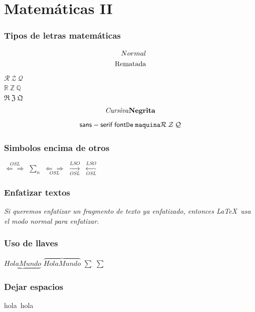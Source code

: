 \documentclass[a4paper,11pt]{article}
\begin{document}
 \listoffigures%
\part{Matemáticas II}
\section{Tipos de letras matemáticas}
\begin{align}
\mathnormal{Normal}\\
\mathrm{Rematada}
\end{align}
$\mathcal{R\:Z\:Q}$ \\%
$\mathbb{R\:Z\:Q}$ \\%
$\mathfrak{R\:Z\:Q}$ \\ %
\begin{displaymath}
  \mathit{Cursiva}\\
  \mathbf{Negrita} \\
  \end{displaymath}
  \begin{displaymath}
  \mathsf{sans-serif\:font} \\
  \mathtt{De\:maquina} \\
  \mathcal{R\:Z\:Q}
\end{displaymath}

\section{Simbolos encima de otros}
$\overset{OSL}{\Longleftarrow\Longrightarrow}$
$\underset{n}{\sum}$
$\underset{OSL}{\Longleftarrow\Longrightarrow}$
$\xrightarrow[OSL]{LSO}$
$\xleftarrow[OSL]{LSO}$
\section{Enfatizar textos}
\emph{Si queremos enfatizar un fragmento de texto ya enfatizado, entonces \LaTeX\ usa el modo \emph{normal} para enfatizar.}
\section{Uso de llaves}
$ \underbrace {Hola Mundo} $
$ \overbrace {Hola Mundo} $
$\displaystyle \sum$%
$\sum$%
\section{Dejar espacios}
hola%
\,hola
\end{document}
